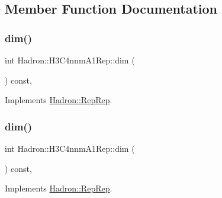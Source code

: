\subsection{Member Function Documentation}
\mbox{\label{structHadron_1_1H3C4nnmA1Rep_adf33664a42201319ff91ef407bcafa44}} 
\subsubsection{\texorpdfstring{dim()}{dim()}\hspace{0.1cm}{\footnotesize\ttfamily [1/5]}}
{\footnotesize\ttfamily int Hadron\+::\+H3\+C4nnm\+A1\+Rep\+::dim (\begin{DoxyParamCaption}{ }\end{DoxyParamCaption}) const\hspace{0.3cm}{\ttfamily [inline]}, {\ttfamily [virtual]}}



Implements \mbox{\hyperlink{structHadron_1_1RepRep_a92c8802e5ed7afd7da43ccfd5b7cd92b}{Hadron\+::\+Rep\+Rep}}.

\mbox{\label{structHadron_1_1H3C4nnmA1Rep_adf33664a42201319ff91ef407bcafa44}} 
\subsubsection{\texorpdfstring{dim()}{dim()}\hspace{0.1cm}{\footnotesize\ttfamily [2/5]}}
{\footnotesize\ttfamily int Hadron\+::\+H3\+C4nnm\+A1\+Rep\+::dim (\begin{DoxyParamCaption}{ }\end{DoxyParamCaption}) const\hspace{0.3cm}{\ttfamily [inline]}, {\ttfamily [virtual]}}



Implements \mbox{\hyperlink{structHadron_1_1RepRep_a92c8802e5ed7afd7da43ccfd5b7cd92b}{Hadron\+::\+Rep\+Rep}}.

\mbox{\label{structHadron_1_1H3C4nnmA1Rep_adf33664a42201319ff91ef407bcafa44}} 
